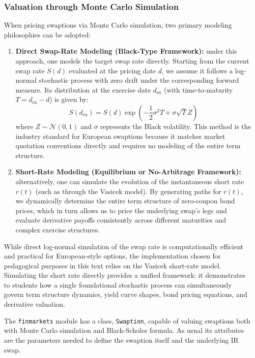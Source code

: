 \subsubsection{Valuation through Monte Carlo Simulation}
\label{evaluation-through-monte-carlo-simulation}

When pricing swaptions via Monte Carlo simulation, two primary modeling philosophies can be adopted:

\begin{enumerate}
	\item \textbf{Direct Swap-Rate Modeling (Black-Type Framework):} under this approach, one models the target swap rate directly. Starting from the current swap rate $S(d)$ evaluated at the pricing date $d$, we assume it follows a log-normal stochastic process with zero drift under the corresponding forward measure. Its distribution at the exercise date $d_{\mathrm{ex}}$ (with time-to-maturity $T = d_{\mathrm{ex}} - d$) is given by:
	\begin{equation*}
		S(d_{\mathrm{ex}}) = S(d)\exp\left(-\frac{1}{2}\sigma^{2}T+\sigma \sqrt{T}Z\right)
	\end{equation*}
	where $Z\sim\mathcal{N}(0,1)$ and $\sigma$ represents the Black volatility. This method is the industry standard for European swaptions because it matches market quotation conventions directly and requires no modeling of the entire term structure.	
	\item \textbf{Short-Rate Modeling (Equilibrium or No-Arbitrage Framework):} alternatively, one can simulate the evolution of the instantaneous short rate $r(t)$ (such as through the Vasicek model). By generating paths for $r(t)$, we dynamically determine the entire term structure of zero-coupon bond prices, which in turn allows us to price the underlying swap's legs and evaluate derivative payoffs consistently across different maturities and complex exercise structures.
\end{enumerate}

While direct log-normal simulation of the swap rate is computationally efficient and practical for European-style options, the implementation chosen for pedagogical purposes in this text relies on the Vasicek short-rate model. Simulating the short rate directly provides a unified framework: it demonstrates to students how a single foundational stochastic process can simultaneously govern term structure dynamics, yield curve shapes, bond pricing equations, and derivative valuation.

\begin{finmarkets}
The \texttt{finmarkets} module has a class, \texttt{Swaption}, capable of valuing swaptions both with Monte Carlo simulation and Black-Scholes formula. As usual its attributes are the parameters needed to define the swaption itself and the underlying IR swap.
\end{finmarkets}


